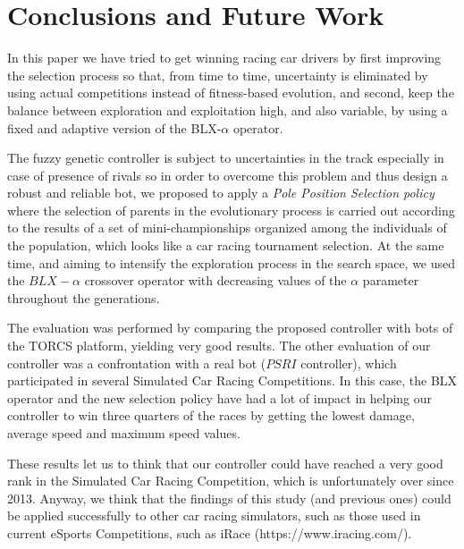 \documentclass[10pt,journal,compsoc]{IEEEtran}
\begin{document}

\section{Conclusions and Future Work} 
\label{sec:conclusions}



In this paper we have tried to get winning racing car drivers by
first improving the selection process so that, from time to time,
uncertainty is eliminated by using actual competitions instead of
fitness-based evolution, and second, keep the balance between
exploration and exploitation high, and also variable, by using a fixed
and adaptive version of the BLX-$\alpha$ operator.

The fuzzy genetic controller is subject to uncertainties in the track especially in case of presence of rivals so in order to overcome this problem and thus design a robust and reliable bot, we proposed to apply a \textit{Pole Position Selection policy} where the selection of parents in the evolutionary process is carried out according to the results of a set of mini-championships organized among the individuals of the population, which looks like a car racing tournament selection.
At the same time, and aiming to intensify the exploration process in the search space, we used the $BLX-\alpha$ crossover operator with decreasing values of the $\alpha$ parameter throughout the generations.

The evaluation was performed by comparing the proposed controller with bots of the TORCS platform, yielding very good results.
The other evaluation of our controller was a confrontation with a real bot ($PSRI$ controller), which participated in several Simulated Car Racing Competitions. In this case, the BLX operator and the new selection policy have had a lot of impact in helping our controller to win three quarters of the races by getting the lowest damage, average speed and maximum speed values.

These results let us to think that our controller could have reached a very good rank in the Simulated Car Racing Competition, which is unfortunately over since 2013. Anyway, we think that the findings of this study (and previous ones) could be applied successfully to other car racing simulators, such as those used in current eSports Competitions, such as iRace (https://www.iracing.com/).
\end{document}
